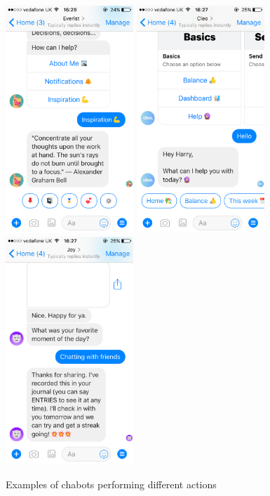\begin{figure}[ht]
  \centering
  \includegraphics[width=1.9in]{../resources/everist.png}
  \hspace{10px}
  \includegraphics[width=1.9in]{../resources/cleo.png}
  \hspace{10px}
  \includegraphics[width=1.9in]{../resources/joy-ai.png}
  \caption{Examples of chabots performing different actions}
  \label{fig:chatbots_examples}
\end{figure}


